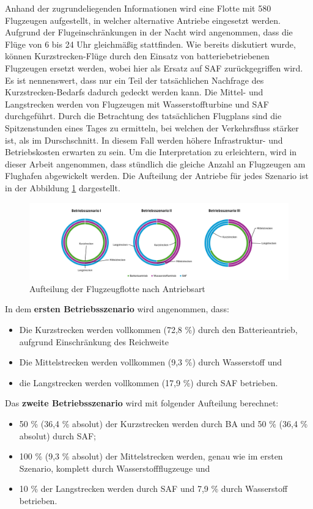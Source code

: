 Anhand der zugrundeliegenden Informationen wird eine Flotte mit 580 Flugzeugen aufgestellt, 
in welcher alternative Antriebe eingesetzt werden.
Aufgrund der Flugeinschränkungen in der Nacht wird angenommen, 
dass die Flüge von 6 bis 24 Uhr gleichmäßig stattfinden. 
Wie bereits diskutiert wurde, können Kurzstrecken-Flüge durch 
den Einsatz von batteriebetriebenen Flugzeugen ersetzt werden, 
wobei hier als Ersatz auf SAF zurückgegriffen wird. 
Es ist nennenswert, dass nur ein Teil der tatsächlichen Nachfrage des Kurzstrecken-Bedarfs 
dadurch gedeckt werden kann. 
Die Mittel- und Langstrecken werden von Flugzeugen mit Wasserstoffturbine und SAF durchgeführt.
%
Durch die Betrachtung des tatsächlichen Flugplans sind die Spitzenstunden eines Tages zu ermitteln, 
bei welchen der Verkehrsfluss stärker ist, als im Durschschnitt.
In diesem Fall werden höhere Infrastruktur- und Betriebskosten erwarten zu sein.
Um die Interpretation zu erleichtern, wird in dieser Arbeit angenommen, 
dass stündlich die gleiche Anzahl an Flugzeugen am Flughafen abgewickelt werden. 
%
Die Aufteilung der Antriebe für jedes Szenario ist in der Abbildung \ref{betriebsszenarien} dargestellt.\\
%
\begin{figure}[h]
	\centering
	\includegraphics[width=1.0\linewidth]{Bilder/Betriebsszenarien.png}
	\caption[Betriebsszenarien]{Aufteilung der Flugzeugflotte nach Antriebsart}
	\label{betriebsszenarien}
\end{figure}
%
In dem \textbf{ersten Betriebsszenario} wird angenommen, dass:
\begin{itemize}
    \item Die Kurzstrecken werden vollkommen (72,8 \%) durch den Batterieantrieb, aufgrund Einschränkung des Reichweite
    \item Die Mittelstrecken werden vollkommen (9,3 \%) durch Wasserstoff und
    \item die Langstrecken werden vollkommen (17,9 \%) durch SAF betrieben.
\end{itemize}
Das \textbf{zweite Betriebsszenario} wird mit folgender Aufteilung berechnet:
\begin{itemize}
    \item 50 \% (36,4 \% absolut) der Kurzstrecken werden durch BA und 50 \% (36,4 \% absolut) durch SAF; 
    \item 100 \% (9,3 \% absolut) der Mittelstrecken werden, genau wie im ersten Szenario, komplett durch Wasserstoffflugzeuge und
    \item 10 \% der Langstrecken werden durch SAF und 7,9 \% durch Wasserstoff betrieben.
\end{itemize}
